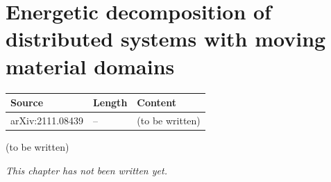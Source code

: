 \chapter{Energetic decomposition of distributed systems with moving material domains}\label{ch:c27}
\begin{paracol}{2}

\begin{sources}
\begin{tabularx}{\linewidth}{@{}l l L@{}}
\toprule
\textbf{Source} & \textbf{Length} & \textbf{Content}\\
\midrule
arXiv:2111.08439 & -- & (to be written)\\
\bottomrule
\end{tabularx}

\end{sources}

\begin{reading}
(to be written)
\end{reading}

\emph{This chapter has not been written yet.}

\flushside
\end{paracol}
